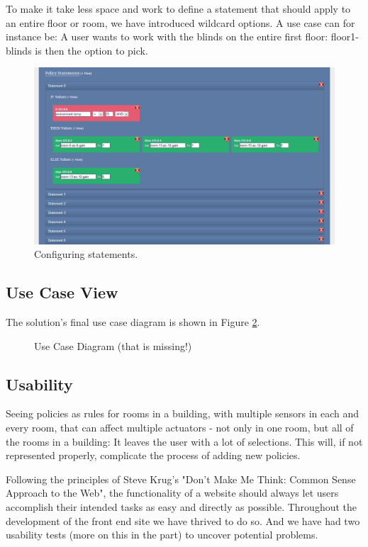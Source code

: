 To make it take less space and work to define a statement that should apply to an entire floor or room, we have introduced wildcard options. A use case can for instance be: A user wants to work with the blinds on the entire first floor: floor1-blinds is then the option to pick.

\begin{figure}[ht]
\centering
\includegraphics[width=\columnwidth]{statement.png}
\caption{Configuring statements.}
\label{fig:statement}
\end{figure}

\subsection{Use Case View}
The solution's final use case diagram is shown in Figure \ref{fig:usecasediagram}.

\begin{figure}[ht]
\centering
\caption{Use Case Diagram (that is missing!)}
\label{fig:usecasediagram}
\end{figure}


\subsection{Usability}
Seeing policies as rules for rooms in a building, with multiple sensors in each and every room, that can affect multiple actuators - not only in one room, but all of the rooms in a building: It leaves the user with a lot of selections. 
This will, if not represented properly, complicate the process of adding new policies.

Following the principles of Steve Krug's "Don't Make Me Think: Common Sense Approach to the Web"\cite{Krug:2005:DMM:1051204}, the functionality of a website should always let users accomplish their intended tasks as easy and directly as possible.
Throughout the development of the front end site we have thrived to do so. And we have had two usability tests (more on this in the  part) to uncover potential problems.

